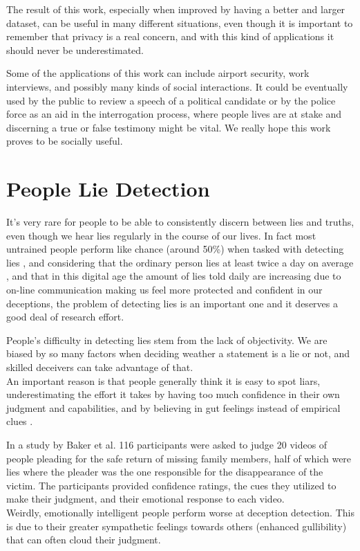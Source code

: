 The result of this work, especially when improved by having a better and larger dataset, can be useful in many different situations, even though it is important to remember that privacy is a real concern, and with this kind of applications it should never be underestimated.

Some of the applications of this work can include airport security, work interviews, and possibly many kinds of social interactions. It could be eventually used by the public to review a speech of a political candidate or by the police force as an aid in the interrogation process, where people lives are at stake and discerning a true or false testimony might be vital. We really hope this work proves to be socially useful.

\clearpage

\section{People Lie Detection} \label{pplLieDet}
It's very rare for people to be able to consistently discern between lies and truths, even though we hear lies regularly in the course of our lives. In fact most untrained people perform like chance (around 50\%) when tasked with detecting lies \cite{Porter2012SecretsAL}, and considering that the ordinary person lies at least twice a day on average \cite{LyingEverydayLife}, and that in this digital age the amount of lies told daily are increasing \cite{DigitalDeception} due to on-line communication making us feel more protected and confident in our deceptions, the problem of detecting lies is an important one and it deserves a good deal of research effort. 

People's difficulty in detecting lies stem from the lack of objectivity. We are biased by so many factors when deciding weather a statement is a lie or not, and skilled deceivers can take advantage of that. \\
An important reason is that people generally think it is easy to spot liars, underestimating the effort it takes by having too much confidence in their own judgment and capabilities, and by believing in gut feelings instead of empirical clues \cite{VrijDLD}. 

In a study by Baker et al.  \cite{EmotionallyIntelligent} 116 participants were asked to judge 20 videos of people pleading for the safe return of missing family members, half of which were lies where the pleader was the one responsible for the disappearance of the victim. The participants provided confidence ratings, the cues they utilized to make their judgment, and their emotional response to each video.\\
Weirdly, emotionally intelligent people perform worse at deception detection. This is due to their greater sympathetic feelings towards others (enhanced gullibility) that can often cloud their judgment.


